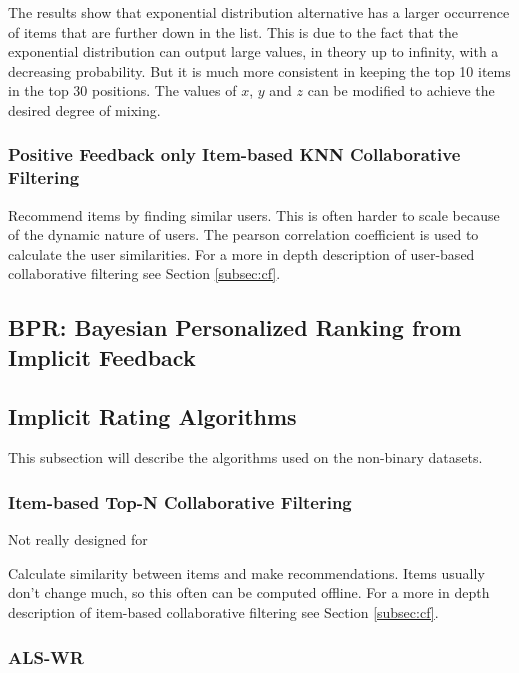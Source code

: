 The results show that exponential distribution alternative has a larger occurrence of items that are further down in the list. This is due to the fact that the exponential distribution can output large values, in theory up to infinity, with a decreasing probability. But it is much more consistent in keeping the top 10 items in the top 30 positions. The values of $x$, $y$ and $z$ can be modified to achieve the desired degree of mixing.

\subsubsection{Positive Feedback only Item-based KNN Collaborative Filtering}

Recommend items by finding similar users. This is often harder to scale because of the dynamic nature of users. The pearson correlation coefficient is used to calculate the user similarities. For a more in depth description of user-based collaborative filtering see Section \ref{subsec:cf}.

\subsection{BPR: Bayesian Personalized Ranking from Implicit Feedback}



\subsection{Implicit Rating Algorithms}

This subsection will describe the algorithms used on the non-binary datasets.

\subsubsection{Item-based Top-N Collaborative Filtering}

Not really designed for 

Calculate similarity between items and make recommendations. Items usually don't change much, so this often can be computed offline. For a more in depth description of item-based collaborative filtering see Section \ref{subsec:cf}.%


\subsubsection{ALS-WR}


